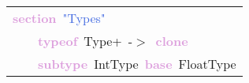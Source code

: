 \begin{tabular}[t]{l}
\noindent
\mbox{}\textbf{\textcolor{Plum}{section}}\ \textcolor{RoyalBlue}{"{}Types"{}} \\
\mbox{}\ \ \ \ \textbf{\textcolor{Plum}{typeof}}\ Type+\ -$>$\ \textbf{\textcolor{Plum}{clone}} \\
\mbox{}\ \ \ \ \textbf{\textcolor{Plum}{subtype}}\ IntType\ \textbf{\textcolor{Plum}{base}}\ FloatType
\end{tabular}

